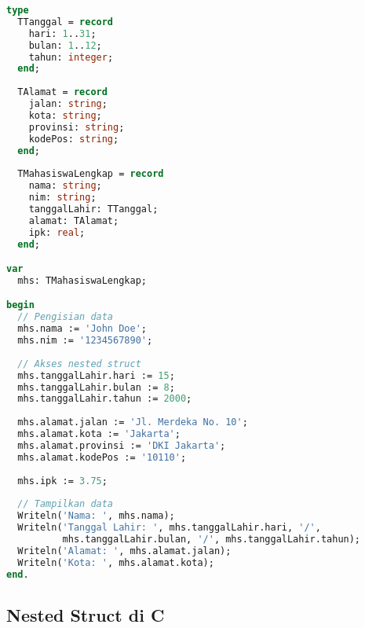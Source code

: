 \documentclass[../main.tex]{subfiles}
\begin{document}
\begin{lstlisting}[language=Pascal, caption={Nested struct di Pascal}]
type
  TTanggal = record
    hari: 1..31;
    bulan: 1..12;
    tahun: integer;
  end;
  
  TAlamat = record
    jalan: string;
    kota: string;
    provinsi: string;
    kodePos: string;
  end;
  
  TMahasiswaLengkap = record
    nama: string;
    nim: string;
    tanggalLahir: TTanggal;
    alamat: TAlamat;
    ipk: real;
  end;

var
  mhs: TMahasiswaLengkap;

begin
  // Pengisian data
  mhs.nama := 'John Doe';
  mhs.nim := '1234567890';
  
  // Akses nested struct
  mhs.tanggalLahir.hari := 15;
  mhs.tanggalLahir.bulan := 8;
  mhs.tanggalLahir.tahun := 2000;
  
  mhs.alamat.jalan := 'Jl. Merdeka No. 10';
  mhs.alamat.kota := 'Jakarta';
  mhs.alamat.provinsi := 'DKI Jakarta';
  mhs.alamat.kodePos := '10110';
  
  mhs.ipk := 3.75;
  
  // Tampilkan data
  Writeln('Nama: ', mhs.nama);
  Writeln('Tanggal Lahir: ', mhs.tanggalLahir.hari, '/',
          mhs.tanggalLahir.bulan, '/', mhs.tanggalLahir.tahun);
  Writeln('Alamat: ', mhs.alamat.jalan);
  Writeln('Kota: ', mhs.alamat.kota);
end.
\end{lstlisting}

\subsection{Nested Struct di C}
\end{document}
